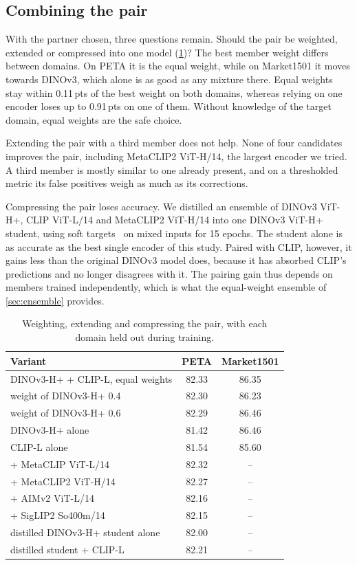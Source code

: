 \documentclass[10pt,twocolumn,letterpaper]{article}
\newcommand{\pts}{\,pts}
\begin{document}
\subsection{Combining the pair}
\label{sec:design}

With the partner chosen, three questions remain. Should the pair be weighted, extended or compressed into one model (\cref{tab:design})? The best member weight differs between domains. On PETA it is the equal weight, while on Market1501 it moves towards DINOv3, which alone is as good as any mixture there. Equal weights stay within 0.11\pts{} of the best weight on both domains, whereas relying on one encoder loses up to 0.91\pts{} on one of them. Without knowledge of the target domain, equal weights are the safe choice.

Extending the pair with a third member does not help. None of four candidates improves the pair, including MetaCLIP2 ViT-H/14, the largest encoder we tried. A third member is mostly similar to one already present, and on a thresholded metric its false positives weigh as much as its corrections.

Compressing the pair loses accuracy. We distilled an ensemble of DINOv3 ViT-H+, CLIP ViT-L/14 and MetaCLIP2 ViT-H/14 into one DINOv3 ViT-H+ student, using soft targets~\cite{hinton} on mixed inputs for 15 epochs. The student alone is as accurate as the best single encoder of this study. Paired with CLIP, however, it gains less than the original DINOv3 model does, because it has absorbed CLIP's predictions and no longer disagrees with it. The pairing gain thus depends on members trained independently, which is what the equal-weight ensemble of \cref{sec:ensemble} provides.

\begin{table}[t]
\centering\small
\setlength{\tabcolsep}{4pt}
\begin{tabular}{@{}lcc@{}}
\toprule
Variant & PETA & Market1501 \\
\midrule
DINOv3-H+ + CLIP-L, equal weights & 82.33 & 86.35 \\
\quad weight of DINOv3-H+ 0.4 & 82.30 & 86.23 \\
\quad weight of DINOv3-H+ 0.6 & 82.29 & 86.46 \\
\quad DINOv3-H+ alone & 81.42 & 86.46 \\
\quad CLIP-L alone & 81.54 & 85.60 \\
\midrule
+ MetaCLIP ViT-L/14 & 82.32 & -- \\
+ MetaCLIP2 ViT-H/14 & 82.27 & -- \\
+ AIMv2 ViT-L/14 & 82.16 & -- \\
+ SigLIP2 So400m/14 & 82.15 & -- \\
\midrule
distilled DINOv3-H+ student alone & 82.00 & -- \\
distilled student + CLIP-L & 82.21 & -- \\
\bottomrule
\end{tabular}
\caption{Weighting, extending and compressing the pair, with each domain held out during training.}
\label{tab:design}
\end{table}
\end{document}
